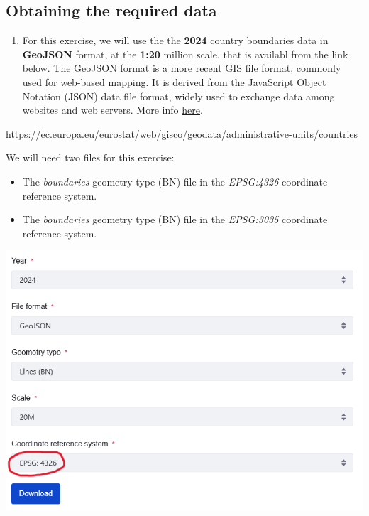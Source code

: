 \documentclass[
  letterpaper,
  DIV=11,
  numbers=noendperiod]{scrreprt}
\providecommand{\tightlist}{%
  \setlength{\itemsep}{0pt}\setlength{\parskip}{0pt}}\usepackage{longtable,booktabs,array}
\begin{document}
\subsection{Obtaining the required
data}\label{obtaining-the-required-data}

\begin{enumerate}
\def\labelenumi{(\arabic{enumi})}
\setcounter{enumi}{44}
\tightlist
\item
  For this exercise, we will use the the \textbf{2024} country
  boundaries data in \textbf{GeoJSON} format, at the \textbf{1:20}
  million scale, that is availabl from the link below. The GeoJSON
  format is a more recent GIS file format, commonly used for web-based
  mapping. It is derived from the JavaScript Object Notation (JSON) data
  file format, widely used to exchange data among websites and web
  servers. More info \href{https://en.wikipedia.org/wiki/GeoJSON}{here}.
\end{enumerate}

\url{https://ec.europa.eu/eurostat/web/gisco/geodata/administrative-units/countries}

We will need two files for this exercise:

\begin{itemize}
\tightlist
\item
  The \emph{boundaries} geometry type (BN) file in the \emph{EPSG:4326}
  coordinate reference system.
\item
  The \emph{boundaries} geometry type (BN) file in the \emph{EPSG:3035}
  coordinate reference system.
\end{itemize}

\includegraphics{images/lab_2/lab2_fig1_eurostat_4326.png}
\end{document}
